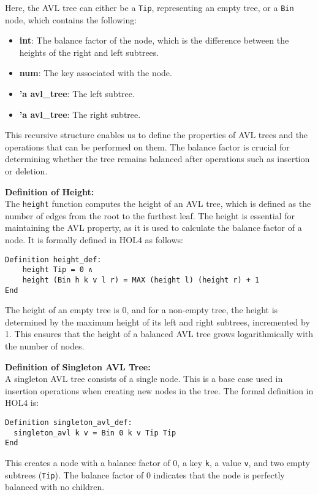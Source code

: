 \documentclass[12pt]{article}
\begin{document}
Here, the AVL tree can either be a \texttt{Tip}, representing an empty tree, or a \texttt{Bin} node, which contains the following:
\begin{itemize}
    \item \textbf{int}: The balance factor of the node, which is the difference between the heights of the right and left subtrees.
    \item \textbf{num}: The key associated with the node.
    \item \textbf{'a avl\_tree}: The left subtree.
    \item \textbf{'a avl\_tree}: The right subtree.
\end{itemize}

This recursive structure enables us to define the properties of AVL trees and the operations that can be performed on them. The balance factor is crucial for determining whether the tree remains balanced after operations such as insertion or deletion.

\textbf{Definition of Height:} \\
The \texttt{height} function computes the height of an AVL tree, which is defined as the number of edges from the root to the furthest leaf. The height is essential for maintaining the AVL property, as it is used to calculate the balance factor of a node. It is formally defined in HOL4 as follows:
\begin{verbatim}
Definition height_def:
    height Tip = 0 ∧ 
    height (Bin h k v l r) = MAX (height l) (height r) + 1
End
\end{verbatim}

The height of an empty tree is 0, and for a non-empty tree, the height is determined by the maximum height of its left and right subtrees, incremented by 1. This ensures that the height of a balanced AVL tree grows logarithmically with the number of nodes.

\textbf{Definition of Singleton AVL Tree:} \\

A singleton AVL tree consists of a single node. This is a base case used in insertion operations when creating new nodes in the tree. The formal definition in HOL4 is:

\begin{verbatim}
Definition singleton_avl_def:
  singleton_avl k v = Bin 0 k v Tip Tip
End
\end{verbatim}
This creates a node with a balance factor of 0, a key \texttt{k}, a value \texttt{v}, and two empty subtrees (\texttt{Tip}). The balance factor of 0 indicates that the node is perfectly balanced with no children.
\end{document}
